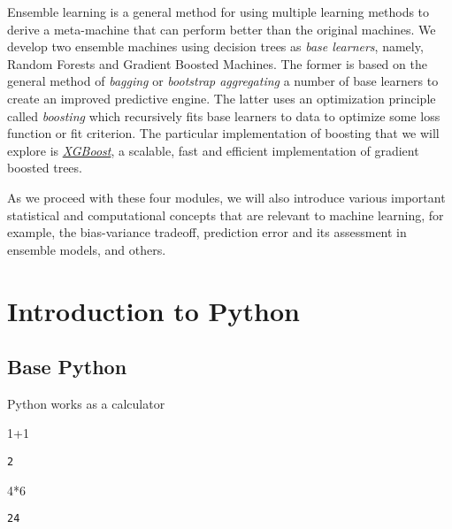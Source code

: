 \documentclass[a4paper,]{scrartcl}
\newenvironment{Shaded}{}{}
\newcommand{\DecValTok}[1]{\textcolor[rgb]{0.25,0.63,0.44}{#1}}
\newcommand{\OperatorTok}[1]{\textcolor[rgb]{0.40,0.40,0.40}{#1}}
\begin{document}
Ensemble learning is a general method for using multiple learning
methods to derive a meta-machine that can perform better than the
original machines. We develop two ensemble machines using decision trees
as \emph{base learners}, namely, Random Forests and Gradient Boosted
Machines. The former is based on the general method of \emph{bagging} or
\emph{bootstrap aggregating} a number of base learners to create an
improved predictive engine. The latter uses an optimization principle
called \emph{boosting} which recursively fits base learners to data to
optimize some loss function or fit criterion. The particular
implementation of boosting that we will explore is
\href{http://xgboost.readthedocs.io/en/latest/}{\emph{XGBoost}}, a
scalable, fast and efficient implementation of gradient boosted trees.

As we proceed with these four modules, we will also introduce various
important statistical and computational concepts that are relevant to
machine learning, for example, the bias-variance tradeoff, prediction
error and its assessment in ensemble models, and others.

\hypertarget{IntroToPython}{\section{Introduction to
Python}\label{IntroToPython}}

\subsection{Base Python}\label{base-python}

Python works as a calculator

\begin{Shaded}
\begin{Highlighting}[]
\DecValTok{1}\OperatorTok{+}\DecValTok{1}
\end{Highlighting}
\end{Shaded}

\begin{verbatim}
2
\end{verbatim}

\begin{Shaded}
\begin{Highlighting}[]
\DecValTok{4}\OperatorTok{*}\DecValTok{6}
\end{Highlighting}
\end{Shaded}

\begin{verbatim}
24
\end{verbatim}
\end{document}
